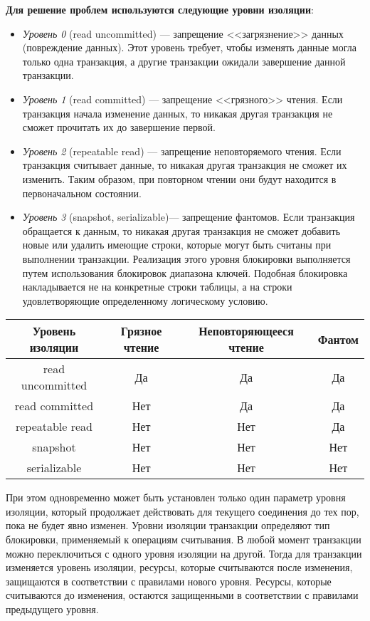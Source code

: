 \textbf{Для решение проблем используются следующие уровни изоляции}:
\begin{itemize}
	\item \textit{Уровень 0} (read uncommitted) --- запрещение <<загрязнение>> данных (повреждение данных). Этот уровень требует, чтобы изменять данные могла только одна транзакция, а другие транзакции ожидали завершение данной транзакции.
	\item \textit{Уровень 1} (read committed) --- запрещение <<грязного>> чтения. Если транзакция начала изменение данных, то никакая другая транзакция не сможет прочитать их до завершение первой.
	\item \textit{Уровень 2} (repeatable read) --- запрещение неповторяемого чтения. Если транзакция считывает данные, то никакая другая транзакция не сможет их изменить. Таким образом, при повторном чтении они будут находится в первоначальном состоянии.
	\item \textit{Уровень 3} (snapshot, serializable)--- запрещение фантомов. Если транзакция обращается к данным, то никакая другая транзакция не сможет добавить новые или удалить имеющие строки, которые могут быть считаны при выполнении транзакции. Реализация этого уровня блокировки выполняется путем использования блокировок диапазона ключей. Подобная блокировка накладывается не на конкретные строки таблицы, а на строки удовлетворяющие определенному логическому условию.
\end{itemize}
\begin{table}[ht!]
	\begin{center}
		\label{tbl:lvl_izo}
		\begin{tabular}{|c|c|c|c|}
			\hline
			Уровень изоляции & Грязное чтение & Неповторяющееся чтение & Фантом \\
			\hline
			read uncommitted & Да & Да & Да\\
			\hline
			read committed & Нет & Да & Да\\
			\hline
			repeatable read & Нет & Нет & Да\\
			\hline
			snapshot & Нет & Нет & Нет\\
			\hline
			serializable & Нет & Нет & Нет\\
			\hline
		\end{tabular}
	\end{center}
\end{table}


При этом одновременно может быть установлен только один параметр уровня изоляции, который продолжает действовать для текущего соединения до тех пор, пока не будет явно изменен.
Уровни изоляции транзакции определяют тип блокировки, применяемый к операциям считывания.
В любой момент транзакции можно переключиться с одного уровня изоляции на другой.
Тогда для транзакции изменяется уровень изоляции, ресурсы, которые считываются после изменения, защищаются в соответствии с правилами нового уровня. Ресурсы, которые считываются до изменения, остаются защищенными в соответствии с правилами предыдущего уровня.

